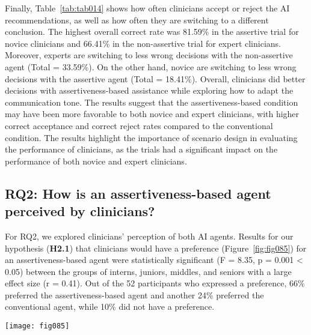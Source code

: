 Finally, Table~\ref{tab:tab014} shows how often clinicians accept or reject the AI recommendations, as well as how often they are switching to a different conclusion.
The highest overall correct rate was 81.59\% in the assertive trial for novice clinicians and 66.41\% in the non-assertive trial for expert clinicians.
Moreover, experts are switching to less wrong decisions with the non-assertive agent (Total = 33.59\%).
On the other hand, novice are switching to less wrong decisions with the assertive agent (Total = 18.41\%).
Overall, clinicians did better decisions with assertiveness-based assistance while exploring how to adapt the communication tone.
The results suggest that the assertiveness-based condition may have been more favorable to both novice and expert clinicians, with higher correct acceptance and correct reject rates compared to the conventional condition.
The results highlight the importance of scenario design in evaluating the performance of clinicians, as the trials had a significant impact on the performance of both novice and expert clinicians.

\subsection{RQ2: How is an assertiveness-based agent perceived by clinicians?}
\label{sec:chap006006002}

For RQ2, we explored clinicians' perception of both AI agents.
Results for our hypothesis ({\bf H2.1}) that clinicians would have a preference (Figure~\ref{fig:fig085}) for an assertiveness-based agent were statistically significant (F = 8.35, p = 0.001 < 0.05) between the groups of interns, juniors, middles, and seniors with a large effect size (r = 0.41).
Out of the 52 participants who expressed a preference, 66\% preferred the assertiveness-based agent and another 24\% preferred the conventional agent, while 10\% did not have a preference.

\begin{figure*}[htpb]
\centering
\texttt{[image: fig085]}
\caption[]{Preference choices of clinicians when comparing between both conventional and assertiveness-based agents within this study. Rates of clinicians are ranging from {\it Totally Conventional} to {\it Totally Assertiveness-based} on perceived {\it reliability}, {\it capability}, and {\it overall preference} of each agent.}
\label{fig:fig085}
\end{figure*}


